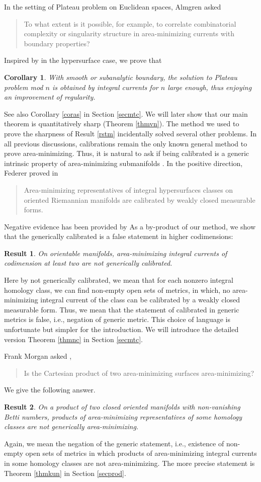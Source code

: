 \documentclass[11pt,a4paper]{amsart}
\numberwithin{equation}{section}
\theoremstyle{plain}
\newtheorem{rst}{Result}
\newtheorem{cor}{Corollary}[subsection]
\theoremstyle{definition}
\numberwithin{equation}{subsection}
\begin{document}
In the setting of Plateau problem on Euclidean spaces, Almgren asked \cite[Problem 4.3]{GMT}
\begin{quote}To what extent is it possible, for example, to correlate combinatorial complexity or singularity structure in area-minimizing currents with boundary properties?
\end{quote}
Inspired by \cite{FMmmn,EWW} in the hypersurface case, we prove that
\begin{cor}\label{thmp}
With smooth or subanalytic boundary, the solution to Plateau problem mod $n$ is obtained by integral currents for $n$ large enough, thus enjoying an improvement of regularity.
\end{cor}
See also Corollary \ref{coras} in Section \ref{secmtc}. We will later show that our main theorem is quantitatively sharp (Theorem \ref{thmvn}). The method we used to prove the sharpness of Result \ref{rstm} incidentally solved several other problems. In all previous discussions, calibrations remain the only known general method to prove area-minimizing. Thus, it is natural to ask if being calibrated is a generic intrinsic property of area-minimizing submanifolds \cite{MOMF}. In the positive direction, Federer proved in \cite[Section 5.10]{HFrf}
\begin{quote}
	Area-minimizing representatives of integral hypersurfaces classes on oriented Riemannian manifolds are calibrated by weakly closed measurable forms.	
\end{quote}
Negative evidence has been provided by \cite{HF,FMmc,BWmc,BKsf,KSsf,MKsf,MFsf} As a by-product of our method, we show that the generically calibrated is a false statement in higher codimensions:
\begin{rst}\label{rstnc}
On orientable manifolds, area-minimizing integral currents of codimension at least two are not generically calibrated.\end{rst}
Here by not generically calibrated, we mean that for each nonzero integral homology class, we can find non-empty open sets of metrics, in which, no area-minimizing integral current of the class can be calibrated by a weakly closed measurable form. Thus, we mean that the statement of calibrated in generic metrics is false, i.e., negation of generic metric. This choice of language is unfortunate but simpler for the introduction. We will introduce the detailed version Theorem \ref{thmnc} in Section \ref{secmtc}.

	Frank Morgan asked \cite[Problem 3.7]{GMT},
\begin{quote}
	Is the Cartesian product of two area-minimizing surfaces area-minimizing?
\end{quote}
We give the following answer.\begin{rst}\label{rstnp}
On a product of two closed oriented manifolds with non-vanishing Betti numbers, products of  area-minimizing representatives of some homology classes are not generically area-minimizing.
\end{rst}
Again, we mean the negation of the generic statement, i.e., existence of non-empty open sets of metrics in which products of area-minimizing integral currents in some homology classes are not area-minimizing. The more precise statement is Theorem \ref{thmkun} in Section \ref{secprod}.
\end{document}
